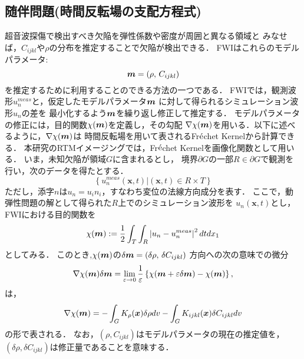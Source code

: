 \subsection{随伴問題(時間反転場の支配方程式)}
超音波探傷で検出すべき欠陥を弾性係数や密度が周囲と異なる領域と
みなせば，$C_{ijkl}$や$\rho$の分布を推定することで欠陥が検出できる．
FWIはこれらのモデルパラメータ:
\begin{equation}
	\boldsymbol{m}=\left( \rho, \, C_{ijkl}\right)
	\label{eqn:mprms}
\end{equation}
を推定するために利用することのできる方法の一つである．
FWIでは，観測波形$u_n^{meas}$と，仮定したモデルパラメータ$\boldsymbol{m}$
に対して得られるシミュレーション波形$u_n$の差を
最小化するよう$\boldsymbol{m}$を繰り返し修正して推定する．
%
モデルパラメータの修正には，目的関数$\chi(\boldsymbol{m})$を定義し，その勾配
$\nabla \chi(\boldsymbol{m})$を用いる．以下に述べるように，$\nabla \chi(\boldsymbol{m})$は
時間反転場を用いて表されるFr$\acute{\rm e}$chet Kernelから計算できる．
本研究のRTMイメージングでは，Fr$\acute{\rm e}$chet Kernelを画像化関数として用いる．
%
いま，未知欠陥が領域$G$に含まれるとし，
境界$\partial G$の一部$R\in\partial G$で観測を行い，次のデータを得たとする．
\begin{equation}
	\left\{ 
	\left. 
	u_n^{meas}(\boldsymbol{x},t)\right|  (\boldsymbol{x},t)\in R\times T
	\right\}
	\label{eqn:data}
\end{equation}
ただし，添字$n$は$u_n=u_in_i$，すなわち変位の法線方向成分を表す．
ここで，動弾性問題の解として得られた$R$上でのシミュレーション波形を
$u_n(\boldsymbol{x},t)$とし，FWIにおける目的関数を
\begin{equation}
	\chi(\boldsymbol{m}):= \frac{1}{2} \int _T\int _R \left|u_n-u_n^{meas}\right|^2 dtdx_1
	\label{eqn:cost}
\end{equation}
としてみる．
このとき,$\chi(\boldsymbol{m})$の$\delta \boldsymbol{m}=(\delta \rho,\, \delta C_{ijkl})$
方向への次の意味での微分
\begin{equation}
	\nabla \chi (\boldsymbol{m})\delta \boldsymbol{m} = \lim_{\varepsilon \rightarrow 0}
	\frac{1}{\varepsilon}
	\left\{
		\chi(\boldsymbol{m}+\varepsilon \delta \boldsymbol{m})
		-
		\chi(\boldsymbol{m})
	\right\}, 
	\label{eqn:del_chi}
\end{equation}
は，
\begin{equation}
	\nabla \chi(\boldsymbol{m}) = 
	-\int_G K_{\rho}(\boldsymbol{x})\delta \rho dv
	- 
	\int_G K_{ijkl}(\boldsymbol{x}) \delta C_{ijkl} dv
	\label{eqn:}
\end{equation}
の形で表される．
%
なお，$(\rho,C_{ijkl})$はモデルパラメータの現在の推定値を，
$(\delta \rho, \delta C_{ijkl})$は修正量であることを意味する．
